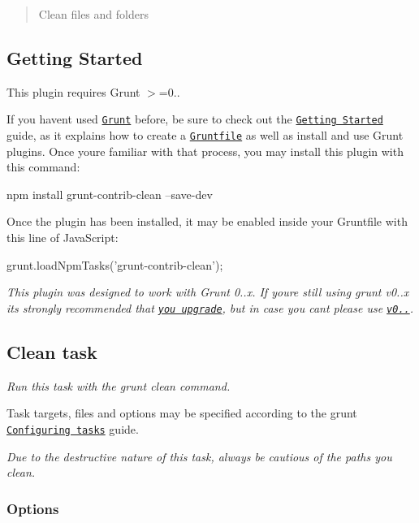 \begin{quote}
Clean files and folders \end{quote}


\subsection*{Getting Started}

This plugin requires Grunt {\ttfamily $>$=0..}

If you haven\textquotesingle{}t used \href{http://gruntjs.com/}{\tt Grunt} before, be sure to check out the \href{http://gruntjs.com/getting-started}{\tt Getting Started} guide, as it explains how to create a \href{http://gruntjs.com/sample-gruntfile}{\tt Gruntfile} as well as install and use Grunt plugins. Once you\textquotesingle{}re familiar with that process, you may install this plugin with this command\+:


\begin{DoxyCode}
npm install grunt-contrib-clean --save-dev
\end{DoxyCode}


Once the plugin has been installed, it may be enabled inside your Gruntfile with this line of Java\+Script\+:


\begin{DoxyCode}
grunt.loadNpmTasks('grunt-contrib-clean');
\end{DoxyCode}


{\itshape This plugin was designed to work with Grunt 0..\+x. If you\textquotesingle{}re still using grunt v0..\+x it\textquotesingle{}s strongly recommended that \href{http://gruntjs.com/upgrading-from-0.3-to-0.4}{\tt you upgrade}, but in case you can\textquotesingle{}t please use \href{https://github.com/gruntjs/grunt-contrib-clean/tree/grunt-0.3-stable}{\tt v0..}.}

\subsection*{Clean task}

{\itshape Run this task with the {\ttfamily grunt clean} command.}

Task targets, files and options may be specified according to the grunt \href{http://gruntjs.com/configuring-tasks}{\tt Configuring tasks} guide.

{\itshape Due to the destructive nature of this task, always be cautious of the paths you clean.} \subsubsection*{Options}

